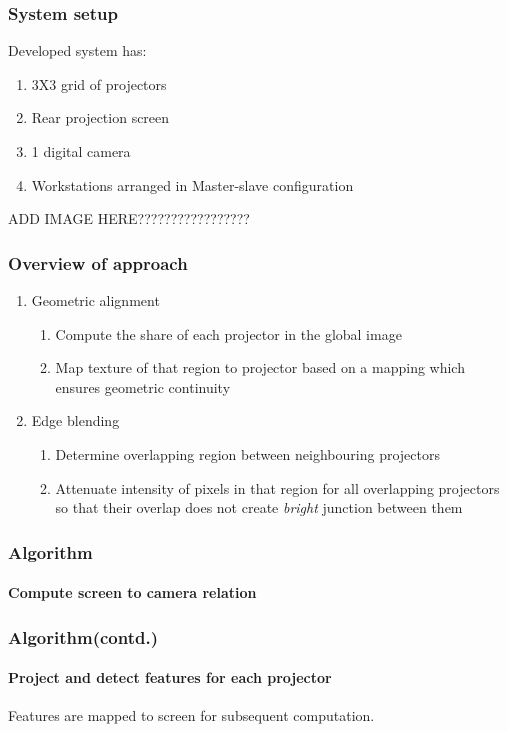 \documentclass{beamer}
\begin{document}
\begin{frame}
\frametitle{System setup}
Developed system has:
\begin{enumerate}
\item 3X3 grid of projectors
\item Rear projection screen
\item 1 digital camera
\item Workstations arranged in Master-slave configuration
\end{enumerate}
ADD IMAGE HERE?????????????????
\end{frame}

\begin{frame}
\frametitle{Overview of approach}
\begin{enumerate}
\item Geometric alignment
\begin{enumerate}
\item Compute the share of each projector in the global image
\item Map texture of that region to projector based on a mapping which ensures geometric continuity
\end{enumerate}
\item Edge blending
\begin{enumerate}
\item Determine overlapping region between neighbouring projectors
\item Attenuate intensity of pixels in that region for all overlapping projectors so that their overlap does not create \textit{bright} junction between them
\end{enumerate}
\end{enumerate}
\end{frame}




\begin{frame}
\frametitle{Algorithm}
\framesubtitle{Compute screen to camera relation}
\end{frame}

\begin{frame}
\frametitle{Algorithm(contd.)}
\framesubtitle{Project and detect features for each projector}
Features are mapped to screen for subsequent computation.
\end{frame}
\end{document}
